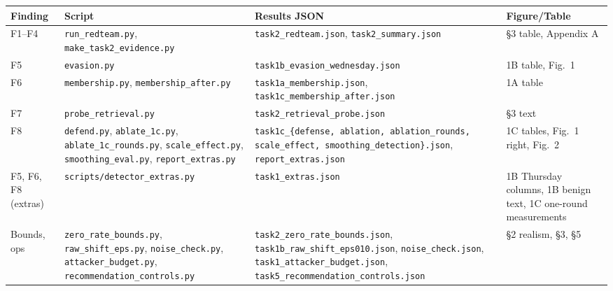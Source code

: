 \begin{center}\fontsize{7}{8.4}\selectfont\setlength{\tabcolsep}{3pt}
\begin{longtable}{@{}l>{\raggedright\arraybackslash}p{}>{\raggedright\arraybackslash}p{}>{\raggedright\arraybackslash}p{}@{}}
\toprule
\textbf{Finding} & \textbf{Script} & \textbf{Results JSON} & \textbf{Figure/Table} \\
\midrule
\endhead
F1--F4 & \texttt{run\_\allowbreak{}redteam.py}, \texttt{make\_\allowbreak{}task2\_\allowbreak{}evidence.py} & \texttt{task2\_\allowbreak{}redteam.json}, \texttt{task2\_\allowbreak{}summary.json} & \S3 table, Appendix A \\
F5 & \texttt{evasion.py} & \texttt{task1b\_\allowbreak{}evasion\_\allowbreak{}wednesday.json} & 1B table, Fig.~1 \\
F6 & \texttt{membership.py}, \texttt{membership\_\allowbreak{}after.py} & \texttt{task1a\_\allowbreak{}membership.json}, \texttt{task1c\_\allowbreak{}membership\_\allowbreak{}after.json} & 1A table \\
F7 & \texttt{probe\_\allowbreak{}retrieval.py} & \texttt{task2\_\allowbreak{}retrieval\_\allowbreak{}probe.json} & \S3 text \\
F8 & \texttt{defend.py}, \texttt{ablate\_\allowbreak{}1c.py}, \texttt{ablate\_\allowbreak{}1c\_\allowbreak{}rounds.py}, \texttt{scale\_\allowbreak{}effect.py}, \texttt{smoothing\_\allowbreak{}eval.py}, \texttt{report\_\allowbreak{}extras.py} & \texttt{task1c\_\allowbreak{}\{defense, ablation, ablation\_\allowbreak{}rounds, scale\_\allowbreak{}effect, smoothing\_\allowbreak{}detection\}.json}, \texttt{report\_\allowbreak{}extras.json} & 1C tables, Fig.~1 right, Fig.~2 \\
F5, F6, F8 (extras) & \texttt{scripts/\allowbreak{}detector\_\allowbreak{}extras.py} & \texttt{task1\_\allowbreak{}extras.json} & 1B Thursday columns, 1B benign text, 1C one-round measurements \\
Bounds, ops & \texttt{zero\_\allowbreak{}rate\_\allowbreak{}bounds.py}, \texttt{raw\_\allowbreak{}shift\_\allowbreak{}eps.py}, \texttt{noise\_\allowbreak{}check.py}, \texttt{attacker\_\allowbreak{}budget.py}, \texttt{recommendation\_\allowbreak{}controls.py} & \texttt{task2\_\allowbreak{}zero\_\allowbreak{}rate\_\allowbreak{}bounds.json}, \texttt{task1b\_\allowbreak{}raw\_\allowbreak{}shift\_\allowbreak{}eps010.json}, \texttt{noise\_\allowbreak{}check.json}, \texttt{task1\_\allowbreak{}attacker\_\allowbreak{}budget.json}, \texttt{task5\_\allowbreak{}recommendation\_\allowbreak{}controls.json} & \S2 realism, \S3, \S5 \\
\bottomrule
\end{longtable}
\end{center}

